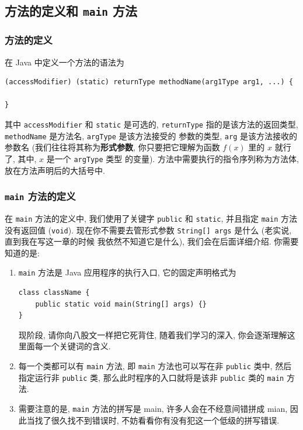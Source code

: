 \documentclass[10pt,UTF8]{book} %
\begin{document}
\subsection{方法的定义和 \lstinline|main| 方法}

\subsubsection{方法的定义}

在 Java 中定义一个方法的语法为
\begin{lstlisting}
(accessModifier) (static) returnType methodName(arg1Type arg1, ...) {

}
\end{lstlisting}
其中 \lstinline|accessModifier| 和 \lstinline|static| 是可选的, 
\lstinline|returnType| 指的是该方法的返回类型, 
\lstinline|methodName| 是方法名,
\lstinline|argType| 是该方法接受的
参数的类型, \lstinline|arg| 是该方法接收的参数名 (我们往往将其称为\textbf{形式参数}, 
你只要把它理解为函数 $f(x)$ 里的 $x$ 就行了, 其中, $x$ 是一个 \lstinline|argType| 类型
的变量). 方法中需要执行的指令序列称为方法体, 放在方法声明后的大括号中.

\subsubsection{\lstinline|main| 方法的定义}

在 \lstinline|main| 方法的定义中, 我们使用了关键字 \lstinline|public| 
和 \lstinline|static|, 并且指定 \lstinline|main| 方法没有返回值 (\lstinline|void|).
现在你不需要去管形式参数 \lstinline|String[] args| 是什么 (老实说, 直到我在写这一章的时候
我依然不知道它是什么), 我们会在后面详细介绍.
你需要知道的是:
\begin{enumerate}
    \item \lstinline|main| 方法是 Java 应用程序的执行入口, 它的固定声明格式为
    \begin{lstlisting}
class className {
    public static void main(String[] args) {}
}
    \end{lstlisting}
    现阶段, 请你向八股文一样把它死背住, 随着我们学习的深入, 你会逐渐理解这里面每一个关键词的含义.
    
    \item 每一个类都可以有 \lstinline|main| 方法,
    即 \lstinline|main| 方法也可以写在非 \lstinline|public| 类中, 然后指定运行非
    \lstinline|public| 类, 那么此时程序的入口就将是该非 \lstinline|public| 
    类的 \lstinline|main| 方法.
    
    \item 需要注意的是, \lstinline|main| 方法的拼写是 main, 许多人会在不经意间错拼成 mian,
    因此当找了很久找不到错误时, 不妨看看你有没有犯这一个低级的拼写错误.
\end{enumerate}
\end{document}
